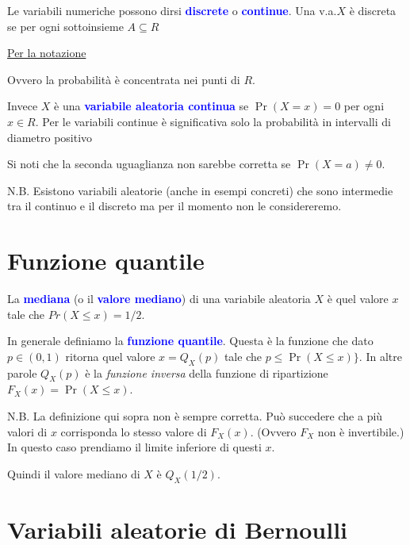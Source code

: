 \documentclass[12pt,openany]{book}
\def\emph#1{\textcolor{blue}{\textbf{\boldmath #1}}}
\theoremstyle{mio}
\theoremstyle{liscio}
\begin{document}
Le variabili numeriche possono dirsi \emph{discrete\/} o \emph{continue}. Una v.a.\@ $X$ è discreta se per ogni sottoinsieme $A\subseteq R$

\hfill\hyperref[sommatorie_disordinate]{Per la notazione \faShare}

Ovvero la probabilità è concentrata nei punti di $R$. 

Invece $X$ è una \emph{variabile aleatoria continua\/} se $\Pr(X{=}x)=0$ per ogni $x\in R$. Per le variabili continue è significativa solo la probabilità in intervalli di diametro positivo



Si noti che la seconda uguaglianza non sarebbe corretta se $\Pr(X{=}a)\neq0$.

N.B. Esistono variabili aleatorie (anche in esempi concreti) che sono intermedie tra il continuo e il discreto ma per il momento non le considereremo.



\hfill{}\clearpage\section{Funzione quantile}


La \emph{mediana\/} (o il \emph{valore mediano}) di una variabile aleatoria $X$ è quel valore $x$ tale che $Pr(X\le x)=1/2$.

In generale definiamo la \emph{funzione quantile}. Questa è la funzione che dato $p\in(0,1)$ ritorna quel valore $x=Q_X(p)$ tale che $p\le\Pr(X\le x)\}$. In altre parole $Q_X(p)$ è la \textit{funzione inversa\/} della funzione di ripartizione $F_X(x)=\Pr(X\le x)$.

N.B. La definizione qui sopra non è sempre corretta. Può succedere che a più valori di $x$ corrisponda lo stesso valore di $F_X(x)$. (Ovvero $F_X$ non è invertibile.) In questo caso prendiamo il limite inferiore di questi $x$.

Quindi il valore mediano di $X$ è $Q_X(1/2)$.


\hfill{}\clearpage\section{Variabili aleatorie di Bernoulli}
\end{document}
